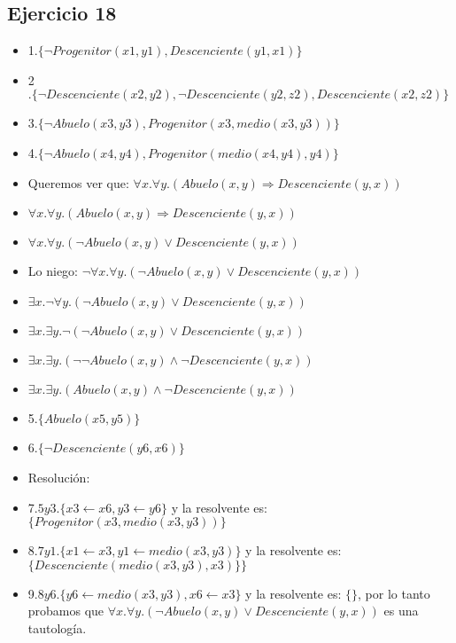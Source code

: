 \documentclass[10pt,a4paper]{article}
\begin{document}
\subsection{Ejercicio 18}
    \begin{itemize}
        \item 1$.\{ \neg Progenitor(x1,y1),Descenciente(y1,x1)\}$ 
        \item 2$.\{ \neg Descenciente(x2,y2), \neg Descenciente(y2,z2), Descenciente(x2,z2)\}$ 
        \item 3$.\{ \neg Abuelo(x3,y3), Progenitor(x3, medio(x3,y3))\}$ 
        \item 4$.\{ \neg Abuelo(x4,y4), Progenitor(medio(x4,y4),y4)\}$ 
        \item Queremos ver que: $\forall x. \forall y. (Abuelo(x,y) \Rightarrow Descenciente(y,x))$ 
        \item $\forall x. \forall y. (Abuelo(x,y) \Rightarrow Descenciente(y,x))$ 
        \item $\forall x. \forall y. (\neg Abuelo(x,y) \vee Descenciente(y,x))$ 
        \item Lo niego: $\neg \forall x. \forall y. (\neg Abuelo(x,y) \vee Descenciente(y,x))$ 
        \item $\exists x. \neg \forall y. (\neg Abuelo(x,y) \vee Descenciente(y,x))$ 
        \item $\exists x. \exists y. \neg (\neg Abuelo(x,y) \vee Descenciente(y,x))$ 
        \item $\exists x. \exists y. (\neg \neg Abuelo(x,y) \wedge \neg Descenciente(y,x))$ 
        \item $\exists x. \exists y. (Abuelo(x,y) \wedge \neg Descenciente(y,x))$ 
        \item 5$.\{Abuelo(x5,y5)\} $  
        \item 6$.\{ \neg Descenciente(y6,x6)\} $ \\
        \item Resolución: 
        \item 7$. 5y3. \{x3 \leftarrow x6, y3 \leftarrow y6\}$ y la resolvente es: $\{Progenitor(x3, medio(x3,y3))\}$ 
        \item 8$. 7y1. \{x1 \leftarrow x3, y1 \leftarrow medio(x3,y3)\}$ y la resolvente es: $\{Descenciente( medio(x3,y3),x3)\}\}$ 
        \item 9.$ 8y6. \{y6 \leftarrow medio(x3,y3), x6 \leftarrow x3\}$ y la resolvente es: $\{\}$, por lo tanto probamos que $\forall x. \forall y. (\neg Abuelo(x,y) \vee Descenciente(y,x))$ es una tautología.
    \end{itemize}
\end{document}
